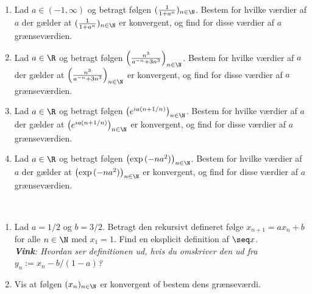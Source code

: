 \begin{opg}\hfill \\
	\begin{enumerate}
		\item Lad $ a\in(-1,\infty) $ og betragt følgen $ (\frac{1}{1+a^n})_{n\in\N} $. Bestem for hvilke værdier af $ a $ der gælder at $ (\frac{1}{1+a^n})_{n\in\N}  $ er konvergent, og find for disse værdier af $ a $ grænseværdien.
		\item Lad $ a\in\R $ og betragt følgen $ \left(\frac{n^3}{a^{-n}+3n^3}\right)_{n\in\N} $. Bestem for hvilke værdier af $ a $ der gælder at $ \left(\frac{n^3}{a^{-n}+3n^3}\right)_{n\in\N}  $ er konvergent, og find for disse værdier af $ a $ grænseværdien.
		\item Lad $ a\in\R $ og betragt følgen $ \left(e^{ia(n+1/n)}\right)_{n\in\N} $. Bestem for hvilke værdier af $ a $ der gælder at $ \left(e^{ia(n+1/n)}\right)_{n\in\N}  $ er konvergent, og find for disse værdier af $ a $ grænseværdien.
		\item Lad $ a\in\R $ og betragt følgen $ \left(\exp{(-na^2)}\right)_{n\in\N} $. Bestem for hvilke værdier af $ a $ der gælder at $ \left(\exp{(-na^2)}\right)_{n\in\N}  $ er konvergent, og find for disse værdier af $ a $ grænseværdien.
	\end{enumerate}
\end{opg}

\begin{opg} \hfill \\
	\begin{enumerate}
		\item Lad $ a=1/2$ og $ b=3/2 $. Betragt den rekursivt defineret følge $ x_{n+1}=ax_{n}+b $ for alle $ n\in\N $ med $ x_1=1 $. Find en eksplicit definition af $ \seq x $.\\
		\emph{\textbf{Vink}: Hvordan ser definitionen ud, hvis du omskriver den ud fra $ y_n:=x_n-b/(1-a) $?}
		\item Vis at følgen $ (x_n)_{n\in\N} $ er konvergent of bestem dens grænseværdi.
	\end{enumerate}
	
\end{opg}


